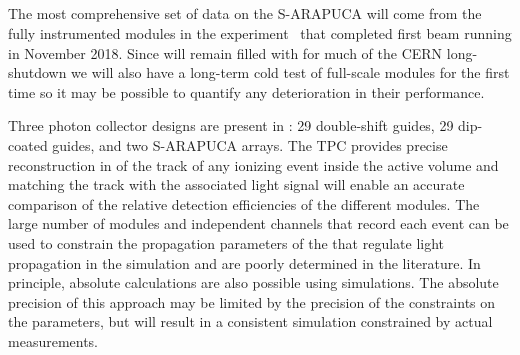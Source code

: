 \subsection{}

The most comprehensive set of data on the S-ARAPUCA will come from the fully instrumented modules in the  experiment~\cite{Abi:2017aow} that completed first beam running in November \num{2018}. 
Since  will remain filled with \lar for much of the CERN long-shutdown we will also have a long-term cold test of full-scale  modules for the first time so it may be possible to quantify any deterioration in their performance.


Three photon collector designs are present in : \num{29} double-shift guides, \num{29} dip-coated guides, and two S-ARAPUCA arrays. 
The TPC provides precise reconstruction in \threed of the track of any ionizing event inside the active volume and matching the track with the associated light signal will enable an accurate comparison of the relative detection efficiencies of the different  modules. 
The large number of modules and independent channels that record each event can be used to constrain the propagation parameters of the \lar that regulate  light propagation in the simulation and are poorly determined in the literature. %
In principle, absolute calculations are also possible using  simulations.
The absolute precision of this approach may be limited by the precision of the constraints on the parameters, but will result in a consistent simulation constrained by actual measurements. 



